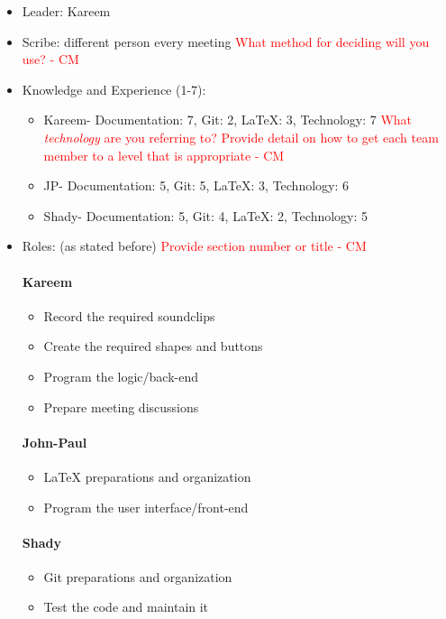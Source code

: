 \documentclass{article}
\begin{document}
\begin{itemize}
\item Leader: Kareem
\item Scribe: different person every meeting \textcolor{red}{What method for deciding will you use? - CM} \\
\item Knowledge and Experience (1-7):
\begin{itemize}
\item Kareem- Documentation: 7, Git: 2, LaTeX: 3, Technology: 7 \textcolor{red}{What \textit{technology} are you referring to? Provide detail on how to get each team member to a level that is appropriate - CM} \\
\item  JP- Documentation: 5, Git: 5, LaTeX: 3, Technology: 6
\item Shady- Documentation: 5, Git: 4, LaTeX: 2, Technology: 5
\end{itemize}
\item Roles: (as stated before) \textcolor{red}{Provide section number or title - CM} \\
\paragraph{Kareem}
\begin{itemize}
\item Record the required soundclips
\item Create the required shapes and buttons
\item Program the logic/back-end
\item Prepare meeting discussions
\end{itemize}
\paragraph{John-Paul}
\begin{itemize}
\item LaTeX preparations and organization
\item Program the user interface/front-end
\end{itemize}
\paragraph{Shady}
\begin{itemize}
\item Git preparations and organization
\item Test the code and maintain it
\end{itemize}
\end{itemize}
\end{document}
